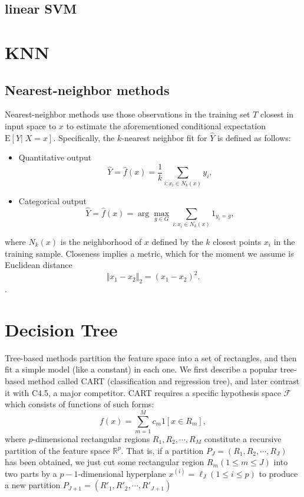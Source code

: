 \documentclass{report}
\theoremstyle{nonumberplain}
\newcommand{\0}{\mathbf{0}}
\begin{document}
\section{linear SVM}


\chapter{KNN}

\section{Nearest-neighbor methods}
Nearest-neighbor methods use those observations in the training set $T$ closest in input space to $x$ to estimate the aforementioned conditional expectation  $\mathrm{E}[Y|\; X=x]$. Specifically, the $k$-nearest neighbor fit for $\hat{Y}$ is defined as follows:
\begin{itemize}
	\item Quantitative output
	\[
	\hat{Y}=\hat{f}(x)=\dfrac{1}{k}\sum_{i:x_i\in N_k(x)}y_i,
	\]
	\item Categorical output
	\[
	\hat{Y}=\hat{f}(x)=\arg\max_{g\in G}\sum_{i:x_i\in N_k(x)}1_{y_i=g},
	\]
\end{itemize}
where $N_k(x)$ is the neighborhood of $x$ defined by the $k$ closest points $x_i$ in the training sample. Closeness implies a metric, which for the moment we assume is Euclidean distance 
\[
\Vert x_1-x_2\Vert_2=(x_1-x_2)^2.
\].


\chapter{Decision Tree}
Tree-based methods partition the feature space into a set of rectangles, and
then fit a simple model (like a constant) in each one. We first describe a popular tree-based method called CART (classification and regression tree), and later contrast it with C4.5, a major competitor. CART requires a specific hypothesis space $\mathcal{F}$ which consists of functions of such forms:
\[
f(x)=\sum_{m=1}^{M} c_{m} 1\left[x \in R_{m}\right],
\]
where $p$-dimensional rectangular regions $R_1,R_2,\cdots,R_M$ constitute a recursive partition of the feature space $\mathbb{R}^p$. That is, if a partition $P_J=(R_1,R_2,\cdots,R_J)$ has been obtained, we just cut some rectangular region $R_m(1\le m\le J)$ into two parts by a $p-1$-dimensional hyperplane $x^{(i)}=\ell_J(1\le i\le p)$ to produce a new partition $P_{J+1}=(R'_1,R'_2,\cdots,R'_{J+1})$
\end{document}
